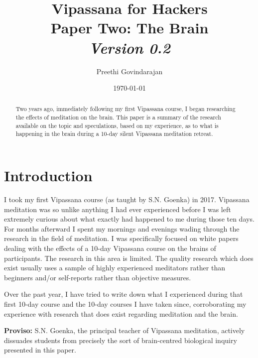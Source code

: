 \documentclass[a4paper, amsfonts, amssymb, amsmath, reprint, showkeys, nofootinbib, twoside]{revtex4-1}
\begin{document}
\title{%
  \Huge{Vipassana for Hackers} \\
  \large{Paper Two: The Brain} \\
  \large\textit{Version 0.2}
}
\author{Preethi Govindarajan}
\date{\today}

\begin{abstract}
  Two years ago, immediately following my first Vipassana course, I began researching
the effects of meditation on the brain. This paper is a summary of the research
available on the topic and speculations, based on my experience, as to what is
happening in the brain during a 10-day silent Vipassana meditation retreat.
\end{abstract}


\maketitle

\listoftodos

\section{Introduction}

I took my first Vipassana course (as taught by S.N. Goenka) in 2017.
Vipassana meditation was so unlike anything I had ever experienced before
I was left extremely curious about what exactly had happened
to me during those ten days. For months afterward I spent my mornings and
evenings wading through the research in the field of meditation. I was specifically
focused on white papers dealing with the effects of a 10-day Vipassana course on
the brains of participants. The research in this area is limited.
The quality research which does exist usually uses a sample of highly
experienced meditators \cite{tibetanmonks} rather than beginners and/or self-reports rather than
objective measures.

Over the past year, I have tried to write down what I experienced during that first
10-day course and the 10-day courses I have taken since, corroborating my experience
with research that does exist regarding meditation and the brain.

\textbf{Proviso:} S.N. Goenka, the principal teacher of Vipassana meditation,
actively dissuades students from precisely the sort of brain-centred biological
inquiry presented in this paper.
\end{document}
